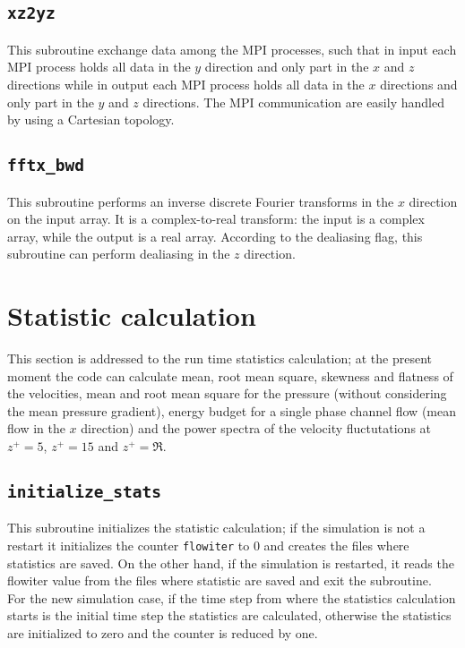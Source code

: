 \subsection{\texttt{xz2yz}}
This subroutine exchange data among the MPI processes, such that in input each MPI process holds all data in the $y$ direction and only part in the $x$ and $z$ directions while in output each MPI process holds all data in the $x$ directions and only part in the $y$ and $z$ directions. The MPI communication are easily handled by using a Cartesian topology.

\subsection{\texttt{fftx\_bwd}}
This subroutine performs an inverse discrete Fourier transforms in the $x$ direction on the input array. It is a complex-to-real transform: the input is a complex array, while the output is a real array. According to the dealiasing flag, this subroutine can perform dealiasing in the $z$ direction.



\section{Statistic calculation}
This section is addressed to the run time statistics calculation; at the present moment the code can calculate mean, root mean square, skewness and flatness of the velocities, mean and root mean square for the pressure (without considering the mean pressure gradient), energy budget for a single phase channel flow (mean flow in the $x$ direction) and the power spectra of the velocity fluctutations at $z^+=5$, $z^+=15$ and $z^+=\Re$.

\subsection{\texttt{initialize\_stats}}
This subroutine initializes the statistic calculation; if the simulation is not a restart it initializes the counter \texttt{flowiter} to 0 and creates the files where statistics are saved. On the other hand, if the simulation is restarted, it reads the flowiter value from the files where statistic are saved and exit the subroutine.\\
For the new simulation case, if the time step from where the statistics calculation starts is the initial time step the statistics are calculated, otherwise the statistics are initialized to zero and the counter is reduced by one.

